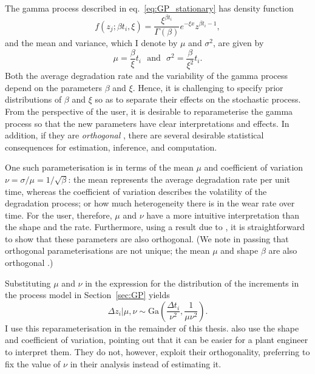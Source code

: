 The gamma process described in eq.~\ref{eq:GP_stationary} has density function
\begin{equation}
  \label{eq:GamDist}
  f(z_j; \beta t_i, \xi) = \frac{\xi^{\beta t_i}}{\Gamma(\beta)} e^{-\xi x} z^{\beta t_i - 1}, 
\end{equation}
and the mean and variance, which I denote by $\mu$ and $\sigma^2$, are given by
\begin{equation}
  \label{eq:GamProp}
  \mu = \frac{\beta}{\xi}t_i \,\,\,\,\mbox{and}\,\,\,\,\sigma^2 = \frac{\beta}{\xi^2}t_i.
\end{equation}
Both the average degradation rate and the variability of the gamma process depend on the parameters $\beta$ and $\xi$. Hence, it is challenging to specify prior distributions of $\beta$ and $\xi$ so as to separate their effects on the stochastic process. From the perspective of the user, it is desirable to reparameterise the gamma process so that the new parameters have clear interpretations and effects. In addition, if they are \emph{orthogonal} \citep{cox_reid_1987}, there are several desirable statistical consequences for estimation, inference, and computation.

One such parameterisation is in terms of the mean $\mu$ and coefficient of variation $\nu = \sigma/\mu = 1/\sqrt{\beta}$: the mean represents the average degradation rate per unit time, whereas the coefficient of variation describes the volatility of the degradation process; or how much heterogeneity there is in the wear rate over time. For the user, therefore, $\mu$ and $\nu$ have a more intuitive interpretation than the shape and the rate. Furthermore, using a result due to \citet{huzurbazar_1956}, it is straightforward to show that these parameters are also orthogonal. (We note in passing that orthogonal parameterisations are not unique; the mean $\mu$ and shape $\beta$ are also orthogonal \citep{huzurbazar_1956}.)

Substituting $\mu$ and $\nu$ in the expression for the distribution of the increments in the process model in Section~\ref{sec:GP} yields
\begin{equation} 
  \label{eq:GP_stationary_reparam}
  \Delta z_i|\mu, \nu \sim \mbox{Ga} \left( \frac{\Delta t_i}{\nu^2}, \frac{1}{\mu \nu^2} \right).
\end{equation}
I use this reparameterisation in the remainder of this thesis. \citet{kallen_optimal_2005} also use the shape and coefficient of variation, pointing out that it can be easier for a plant engineer to interpret them. They do not, however, exploit their orthogonality, preferring to fix the value of $\nu$ in their analysis instead of estimating it.

